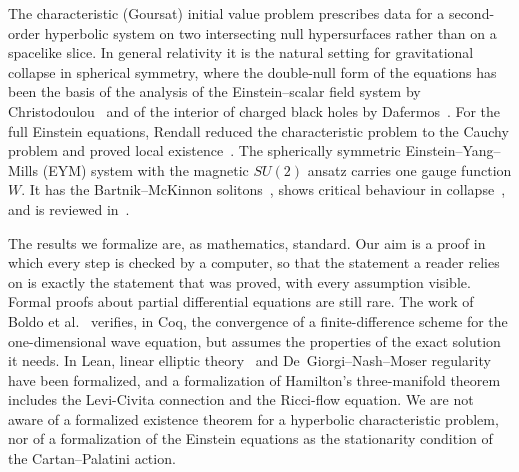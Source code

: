 \documentclass[11pt]{amsart}
\theoremstyle{definition}
\theoremstyle{remark}
\begin{document}
The characteristic (Goursat) initial value problem prescribes data for a second-order hyperbolic system on two intersecting null hypersurfaces rather than on a spacelike slice. In general relativity it is the natural setting for gravitational collapse in spherical symmetry, where the double-null form of the equations has been the basis of the analysis of the Einstein--scalar field system by Christodoulou~\cite{Christodoulou1986,Christodoulou1993} and of the interior of charged black holes by Dafermos~\cite{Dafermos2005}. For the full Einstein equations, Rendall reduced the characteristic problem to the Cauchy problem and proved local existence~\cite{Rendall1990}. The spherically symmetric Einstein--Yang--Mills (EYM) system with the magnetic $SU(2)$ ansatz carries one gauge function $W$. It has the Bartnik--McKinnon solitons~\cite{BartnikMcKinnon1988}, shows critical behaviour in collapse~\cite{ChoptuikChmajBizon1996}, and is reviewed in~\cite{VolkovGaltsov1999}.

The results we formalize are, as mathematics, standard. Our aim is a proof in which every step is checked by a computer, so that the statement a reader relies on is exactly the statement that was proved, with every assumption visible. Formal proofs about partial differential equations are still rare. The work of Boldo et al.~\cite{Boldo2014} verifies, in Coq, the convergence of a finite-difference scheme for the one-dimensional wave equation, but assumes the properties of the exact solution it needs. In Lean, linear elliptic theory~\cite{SotoFrancoMarshallStevens} and De~Giorgi--Nash--Moser regularity~\cite{ArmstrongKempe2026} have been formalized, and a formalization of Hamilton's three-manifold theorem~\cite{ChowLiaoQin2026} includes the Levi-Civita connection and the Ricci-flow equation. We are not aware of a formalized existence theorem for a hyperbolic characteristic problem, nor of a formalization of the Einstein equations as the stationarity condition of the Cartan--Palatini action.
\end{document}
